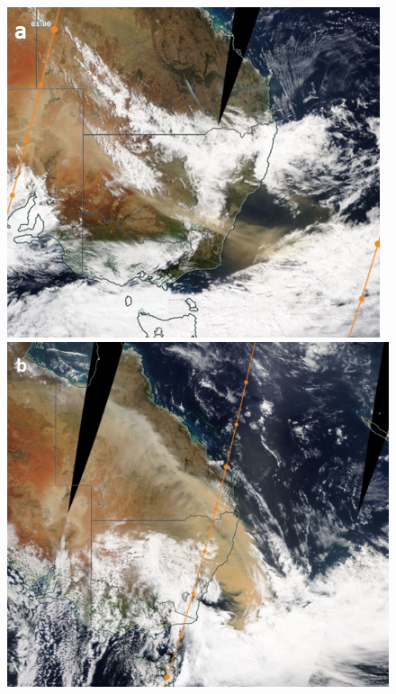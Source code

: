 \documentclass[12pt,a4paper,onecolumn]{scrartcl}
\begin{document}
\begin{figure}
	\begin{minipage}[c]{0.33\textwidth}
		\includegraphics[width=\textwidth]{bilder/reddawn/2209T01.png}
	\end{minipage}\hfill
		\begin{minipage}[c]{0.329\textwidth}
		\includegraphics[width=\textwidth]{bilder/reddawn/2309T00.png}
	\end{minipage}\hfill

\end{figure}
\end{document}
